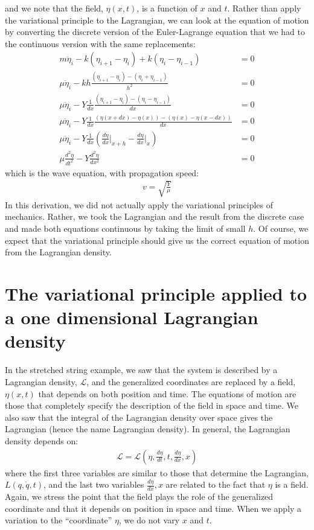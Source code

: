 and we note that the field, $\eta(x,t)$, is a function of $x$ and $t$. Rather than apply the variational principle to the Lagrangian, we can look at the equation of motion by converting the discrete version of the Euler-Lagrange equation that we had to the continuous version with the same replacements:
\begin{align}
m\ddot\eta_i-k(\eta_{i+1}-\eta_i)+k(\eta_i-\eta_{i-1})&=0\nonumber\\
\mu\ddot\eta_i-kh\frac{(\eta_{i+1}-\eta_i)-(\eta_i+\eta_{i-1})}{h^2}&=0\nonumber\\
\mu\ddot\eta_i-Y\frac{1}{dx}\frac{(\eta_{i+1}-\eta_i)-(\eta_i-\eta_{i-1})}{dx}&=0\nonumber\\
\mu\ddot\eta_i-Y\frac{1}{dx}\frac{(\eta(x+dx)-\eta(x))-(\eta(x)-\eta(x-dx))}{dx}&=0\nonumber\\
\mu\ddot\eta_i-Y\frac{1}{dx}\left(\frac{d\eta}{dx}\bigr\rvert_{x+h}-\frac{d\eta}{dx}\bigr\rvert_x\right)&=0\nonumber\\
\mu\frac{d^2\eta}{dt^2}-Y\frac{d^2\eta}{dx^2}&=0
\end{align}
which is the wave equation, with propagation speed:
\begin{align}
v=\sqrt{\frac{Y}{\mu}}
\end{align}
In this derivation, we did not actually apply the variational principles of mechanics. Rather, we took the Lagrangian and the result from the discrete case and made both equations continuous by taking the limit of small $h$. Of course, we expect that the variational principle should give us the correct equation of motion  from the Lagrangian density. 

\section{The variational principle applied to a one dimensional Lagrangian density}
In the stretched string example, we saw that the system is described by a Lagrangian density, $\mathcal{L}$, and the generalized coordinates are replaced by a field, $\eta(x,t)$ that depends on both position and time. The equations of motion are those that completely specify the description of the field in space and time. We also saw that the integral of the Lagrangian density over space gives the Lagrangian (hence the name Lagrangian density). In general, the Lagrangian density depends on:
\begin{align}
\mathcal{L}=\mathcal{L}(\eta,\frac{d\eta}{dt},t,\frac{d\eta}{dx},x)
\end{align}
where the first three variables are similar to those that determine the Lagrangian, $L(q,\dot q, t)$, and the last two variables $\frac{d\eta}{dx},x$ are related to the fact that $\eta$ is a field. Again, we stress the point that the field plays the role of the generalized coordinate and that it depends on position in space and time. When we apply a variation to the ``coordinate'' $\eta$, we do not vary $x$ and $t$.

